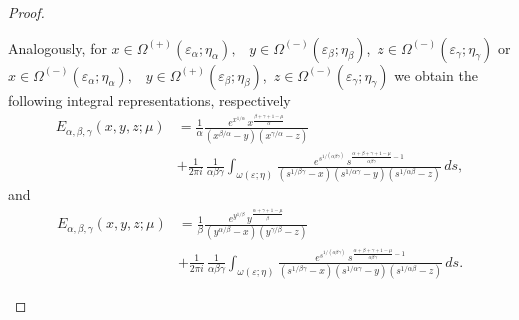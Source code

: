 \documentclass[10pt,a4paper]{amsart}
\begin{document}
\begin{proof}
\begin{remark} Analogously, for  $x\in\Omega^{(+)}(\varepsilon_{\alpha};\eta_\alpha),$
\,
$y\in\Omega^{(-)}(\varepsilon_{\beta};\eta_\beta)$,\, $z\in\Omega^{(-)}(\varepsilon_{\gamma};\eta_\gamma)$ or $x\in\Omega^{(-)}(\varepsilon_{\alpha};\eta_\alpha),$
\,
$y\in\Omega^{(+)}(\varepsilon_{\beta};\eta_\beta)$,\, $z\in\Omega^{(-)}(\varepsilon_{\gamma};\eta_\gamma)$
we obtain the following integral representations, respectively 
$$\begin{aligned}
E_{\alpha,\beta,\gamma}(x,y,z;\mu)
&=\frac{1}{\alpha}\frac{
e^{x^{1/\alpha}}
\,x^{\frac{\beta+\gamma+1-\mu}{\alpha}}}
{(x^{\beta/\alpha}-y)(x^{\gamma/\alpha}-z)}\\
&+
\frac{1}{2\pi i}\,
\frac{1}{\alpha\beta\gamma}
\int_{\omega(\varepsilon;\eta)}
\frac{
e^{s^{1/(\alpha\beta\gamma)}}
\,s^{\frac{\alpha+\beta+\gamma+1-\mu}{\alpha\beta\gamma}-1}
}
{
(s^{1/\beta\gamma}-x)(s^{1/\alpha\gamma}-y)(s^{1/\alpha\beta}-z)
}
\,ds,\end{aligned}
$$
and 
$$\begin{aligned}
E_{\alpha,\beta,\gamma}(x,y,z;\mu)
&=\frac{1}{\beta}\frac{
e^{y^{1/\beta}}
\,y^{\frac{\alpha+\gamma+1-\mu}{\beta}}}
{(y^{\alpha/\beta}-x)(y^{\gamma/\beta}-z)}\\
&+
\frac{1}{2\pi i}\,
\frac{1}{\alpha\beta\gamma}
\int_{\omega(\varepsilon;\eta)}
\frac{
e^{s^{1/(\alpha\beta\gamma)}}
\,s^{\frac{\alpha+\beta+\gamma+1-\mu}{\alpha\beta\gamma}-1}
}
{
(s^{1/\beta\gamma}-x)(s^{1/\alpha\gamma}-y)(s^{1/\alpha\beta}-z)
}
\,ds.\end{aligned}
$$\end{remark}


\end{proof}
\end{document}
